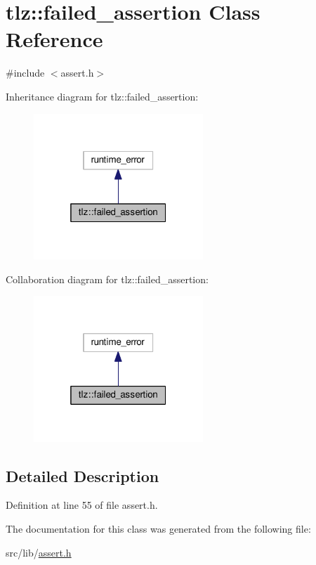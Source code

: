 \hypertarget{classtlz_1_1failed__assertion}{}\section{tlz\+:\+:failed\+\_\+assertion Class Reference}
\label{classtlz_1_1failed__assertion}


{\ttfamily \#include $<$assert.\+h$>$}



Inheritance diagram for tlz\+:\+:failed\+\_\+assertion\+:
\nopagebreak
\begin{figure}[H]
\begin{center}
\leavevmode
\includegraphics[width=181pt]{classtlz_1_1failed__assertion__inherit__graph}
\end{center}
\end{figure}


Collaboration diagram for tlz\+:\+:failed\+\_\+assertion\+:
\nopagebreak
\begin{figure}[H]
\begin{center}
\leavevmode
\includegraphics[width=181pt]{classtlz_1_1failed__assertion__coll__graph}
\end{center}
\end{figure}


\subsection{Detailed Description}


Definition at line 55 of file assert.\+h.



The documentation for this class was generated from the following file\+:\begin{DoxyCompactItemize}
\item 
src/lib/\hyperlink{assert_8h}{assert.\+h}\end{DoxyCompactItemize}
